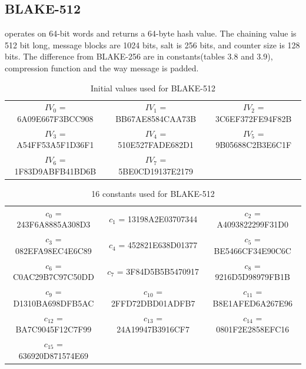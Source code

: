 \subsection{BLAKE-512}

operates on 64-bit words and returns a 64-byte hash value. The chaining value is 512 bit long, message blocks are
1024 bits, salt is 256 bits, and counter size is 128 bits. The difference from BLAKE-256 are in constants(tables 3.8 
and 3.9), compression function and the way message is padded.

  \begin{table}
    \begin{center}
      \begin{tabular}{ *{3}{c}}
        $IV_{0}$ = 6A09E667F3BCC908 & $IV_{1}$ = BB67AE8584CAA73B & $IV_{2}$ = 3C6EF372FE94F82B \\
        $IV_{3}$ = A54FF53A5F1D36F1 & $IV_{4}$ = 510E527FADE682D1 & $IV_{5}$ = 9B05688C2B3E6C1F \\
        $IV_{6}$ = 1F83D9ABFB41BD6B & $IV_{7}$ = 5BE0CD19137E2179 &                             \\
      \end{tabular}
      \caption{Initial values used for BLAKE-512}
    \end{center}
  \end{table}
  
  \begin{table}
    \begin{center}
      \begin{tabular}{ *{3}{c}}
        $c_{0}$  = 243F6A8885A308D3 & $c_{1}$  = 13198A2E03707344 & $c_{2}$  = A4093822299F31D0 \\
        $c_{3}$  = 082EFA98EC4E6C89 & $c_{4}$  = 452821E638D01377 & $c_{5}$  = BE5466CF34E90C6C \\
        $c_{6}$  = C0AC29B7C97C50DD & $c_{7}$  = 3F84D5B5B5470917 & $c_{8}$  = 9216D5D98979FB1B \\
        $c_{9}$  = D1310BA698DFB5AC & $c_{10}$ = 2FFD72DBD01ADFB7 & $c_{11}$ = B8E1AFED6A267E96 \\
        $c_{12}$ = BA7C9045F12C7F99 & $c_{13}$ = 24A19947B3916CF7 & $c_{14}$ = 0801F2E2858EFC16 \\
        $c_{15}$ = 636920D871574E69 &                             &                             \\
      \end{tabular}
      \caption{16 constants used for BLAKE-512}
    \end{center}
  \end{table}
  
